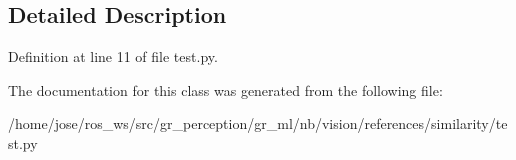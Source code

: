 \subsection{Detailed Description}


Definition at line 11 of file test.\+py.



The documentation for this class was generated from the following file\+:\begin{DoxyCompactItemize}
\item 
/home/jose/ros\+\_\+ws/src/gr\+\_\+perception/gr\+\_\+ml/nb/vision/references/similarity/test.\+py\end{DoxyCompactItemize}
